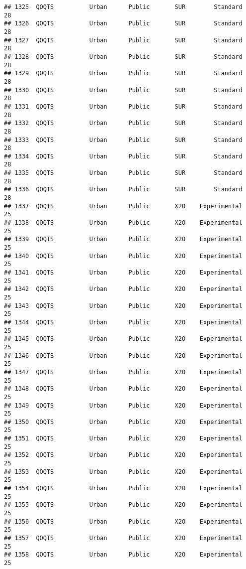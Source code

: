 \documentclass[
]{article}
\begin{document}
\begin{verbatim}
## 1325  QOQTS          Urban      Public       SUR        Standard        28
## 1326  QOQTS          Urban      Public       SUR        Standard        28
## 1327  QOQTS          Urban      Public       SUR        Standard        28
## 1328  QOQTS          Urban      Public       SUR        Standard        28
## 1329  QOQTS          Urban      Public       SUR        Standard        28
## 1330  QOQTS          Urban      Public       SUR        Standard        28
## 1331  QOQTS          Urban      Public       SUR        Standard        28
## 1332  QOQTS          Urban      Public       SUR        Standard        28
## 1333  QOQTS          Urban      Public       SUR        Standard        28
## 1334  QOQTS          Urban      Public       SUR        Standard        28
## 1335  QOQTS          Urban      Public       SUR        Standard        28
## 1336  QOQTS          Urban      Public       SUR        Standard        28
## 1337  QOQTS          Urban      Public       X2O    Experimental        25
## 1338  QOQTS          Urban      Public       X2O    Experimental        25
## 1339  QOQTS          Urban      Public       X2O    Experimental        25
## 1340  QOQTS          Urban      Public       X2O    Experimental        25
## 1341  QOQTS          Urban      Public       X2O    Experimental        25
## 1342  QOQTS          Urban      Public       X2O    Experimental        25
## 1343  QOQTS          Urban      Public       X2O    Experimental        25
## 1344  QOQTS          Urban      Public       X2O    Experimental        25
## 1345  QOQTS          Urban      Public       X2O    Experimental        25
## 1346  QOQTS          Urban      Public       X2O    Experimental        25
## 1347  QOQTS          Urban      Public       X2O    Experimental        25
## 1348  QOQTS          Urban      Public       X2O    Experimental        25
## 1349  QOQTS          Urban      Public       X2O    Experimental        25
## 1350  QOQTS          Urban      Public       X2O    Experimental        25
## 1351  QOQTS          Urban      Public       X2O    Experimental        25
## 1352  QOQTS          Urban      Public       X2O    Experimental        25
## 1353  QOQTS          Urban      Public       X2O    Experimental        25
## 1354  QOQTS          Urban      Public       X2O    Experimental        25
## 1355  QOQTS          Urban      Public       X2O    Experimental        25
## 1356  QOQTS          Urban      Public       X2O    Experimental        25
## 1357  QOQTS          Urban      Public       X2O    Experimental        25
## 1358  QOQTS          Urban      Public       X2O    Experimental        25

\end{verbatim}
\end{document}
